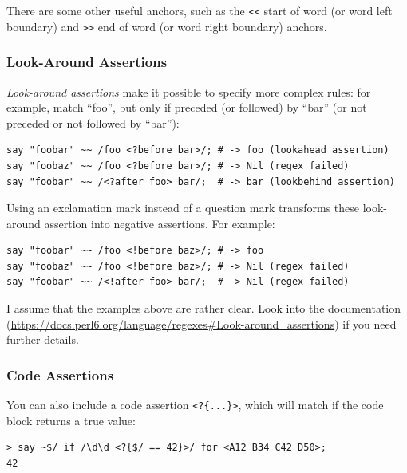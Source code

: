 There are some other useful anchors, such as the \verb'<<' 
start of word (or word left boundary) and \verb'>>' end 
of word (or word right boundary) anchors.

\subsubsection{Look-Around Assertions}


\emph{Look-around assertions} make it possible to 
specify more complex rules: for example, match ``foo'', 
but only if preceded (or followed) by ``bar'' (or not 
preceded or not followed by ``bar''):

\begin{verbatim}
say "foobar" ~~ /foo <?before bar>/; # -> foo (lookahead assertion)
say "foobaz" ~~ /foo <?before bar>/; # -> Nil (regex failed)
say "foobar" ~~ /<?after foo> bar/;  # -> bar (lookbehind assertion)
\end{verbatim}
%
Using an exclamation mark instead of a question mark transforms 
these look-around assertion into negative assertions. For example:

\begin{verbatim}
say "foobar" ~~ /foo <!before baz>/; # -> foo 
say "foobaz" ~~ /foo <!before baz>/; # -> Nil (regex failed)
say "foobar" ~~ /<!after foo> bar/;  # -> Nil (regex failed)
\end{verbatim}
%
I assume that the examples above are rather clear. Look into the 
documentation 
(\url{https://docs.perl6.org/language/regexes#Look-around_assertions}) 
if you need further details. 

\subsubsection{Code Assertions}

You can also include a code assertion \verb'<?{...}>', which 
will match if the code block returns a true value:

\begin{verbatim}
> say ~$/ if /\d\d <?{$/ == 42}>/ for <A12 B34 C42 D50>;
42
\end{verbatim}


